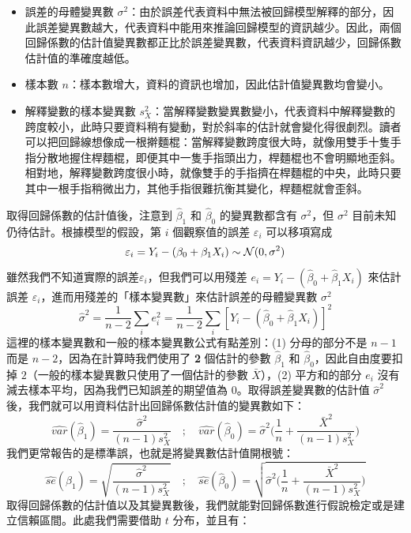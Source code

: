     \begin{itemize}
        \item 誤差的母體變異數 $\sigma^2$：由於誤差代表資料中無法被回歸模型解釋的部分，因此誤差變異數越大，代表資料中能用來推論回歸模型的資訊越少。因此，兩個回歸係數的估計值變異數都正比於誤差變異數，代表資料資訊越少，回歸係數估計值的準確度越低。
        \item 樣本數 $n$：樣本數增大，資料的資訊也增加，因此估計值變異數均會變小。
        \item 解釋變數的樣本變異數 $s_X^2$：當解釋變數變異數變小，代表資料中解釋變數的跨度較小，此時只要資料稍有變動，對於斜率的估計就會變化得很劇烈。讀者可以把回歸線想像成一根擀麵棍：當解釋變數跨度很大時，就像用雙手十隻手指分散地握住桿麵棍，即便其中一隻手指頭出力，桿麵棍也不會明顯地歪斜。相對地，解釋變數跨度很小時，就像雙手的手指擠在桿麵棍的中央，此時只要其中一根手指稍微出力，其他手指很難抗衡其變化，桿麵棍就會歪斜。
    \end{itemize}
    取得回歸係數的估計值後，注意到 $\hat{\beta}_1$ 和 $\hat{\beta}_0$ 的變異數都含有 $\sigma^2$，但 $\sigma^2$ 目前未知仍待估計。根據模型的假設，第 $i$ 個觀察值的誤差 $\varepsilon_i$ 可以移項寫成
    \smallskip
    \[\varepsilon_i = Y_i - (\beta_0 + \beta_1 X_i) \sim \mathcal{N}(0, \sigma^2)\]
    \smallskip
    雖然我們不知道實際的誤差$\varepsilon_i$，但我們可以用殘差 $e_i = Y_i - (\hat{\beta}_0 + \hat{\beta}_1 X_i)$ 來估計誤差 $\varepsilon_i$，進而用殘差的「樣本變異數」來估計誤差的母體變異數 $\sigma^2$
    \smallskip
    \[\hat{\sigma}^2 = \frac{1}{n-2}\sum_i e_i^2 = \frac{1}{n-2}\sum_i [Y_i - (\hat{\beta}_0 + \hat{\beta}_1 X_i)]^2\]
    \smallskip
    這裡的樣本變異數和一般的樣本變異數公式有點差別：(1) 分母的部分不是 $n-1$ 而是 $n-2$，因為在計算時我們使用了 \textbf{2} 個估計的參數 $\hat{\beta}_1$ 和 $\hat{\beta}_0$，因此自由度要扣掉 $2$（一般的樣本變異數只使用了一個估計的參數 $\bar{X}$），(2) 平方和的部分 $e_i$ 沒有減去樣本平均，因為我們已知誤差的期望值為 $0$。取得誤差變異數的估計值 $\hat{\sigma}^2$ 後，我們就可以用資料估計出回歸係數估計值的變異數如下：
    \smallskip
    \[\widehat{var}(\hat{\beta}_1) = \frac{\widehat{\sigma}^2}{(n-1)s_X^2} \quad ; \quad \widehat{var}(\hat{\beta}_0) = \hat{\sigma}^2\Big(\frac{1}{n} + \frac{\bar{X}^2}{(n-1)s_X^2}\Big)\]
    \smallskip
    我們更常報告的是標準誤，也就是將變異數估計值開根號：
    \smallskip
    \[\widehat{se}(\hat{\beta}_1) = \sqrt{\frac{\widehat{\sigma}^2}{(n-1)s_X^2}} \quad ; \quad \widehat{se}(\hat{\beta}_0) = \sqrt{\hat{\sigma}^2\Big(\frac{1}{n} + \frac{\bar{X}^2}{(n-1)s_X^2}\Big)}\]
    \smallskip
    取得回歸係數的估計值以及其變異數後，我們就能對回歸係數進行假說檢定或是建立信賴區間。此處我們需要借助 $t$ 分布，並且有：
